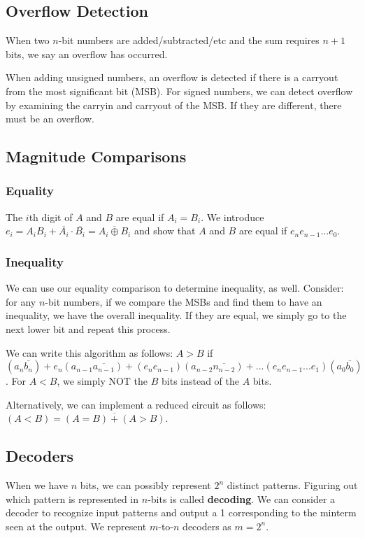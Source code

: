 \documentclass[12pt]{article}
\begin{document}
\subsection*{Overflow Detection}
When two $n$-bit numbers are added/subtracted/etc and the sum requires $n+1$ bits, we say an overflow has occurred.

When adding unsigned numbers, an overflow is detected if there is a carryout from the most significant bit (MSB). For signed numbers, we can detect overflow by examining the carryin and carryout of the MSB. If they are different, there must be an overflow.

\subsection*{Magnitude Comparisons}
\subsubsection*{Equality}
The $i$th digit of $A$ and $B$ are equal if $A_i = B_i$. We introduce $e_i = A_iB_i + \overline{A_i} \cdot \overline{B_i} = \overline{A_i \oplus B_i}$ and show that $A$ and $B$ are equal if $e_ne_{n-1}...e_0$.

\subsubsection*{Inequality}
We can use our equality comparison to determine inequality, as well. Consider: for any $n$-bit numbers, if we compare the MSBs and find them to have an inequality, we have the overall inequality. If they are equal, we simply go to the next lower bit and repeat this process.

We can write this algorithm as follows: $A > B$ if $(a_n\overline{b_n}) + e_n(a_{n-1}\overline{a_{n-1}}) + (e_ne_{n-1})(a_{n-2}\overline{n_{n-2}}) + ... (e_ne_{n-1}...e_1)(a_0\overline{b_0})$. For $A < B$, we simply NOT the $B$ bits instead of the $A$ bits.

Alternatively, we can implement a reduced circuit as follows: $(A < B) = \overline{(A = B) + (A > B)}$.

\subsection*{Decoders}
When we have $n$ bits, we can possibly represent $2^n$ distinct patterns. Figuring out which pattern is represented in $n$-bits is called {\bf decoding}. We can consider a decoder to recognize input patterns and output a 1 corresponding to the minterm seen at the output. We represent $m$-to-$n$ decoders as $m = 2^n$.
\end{document}
